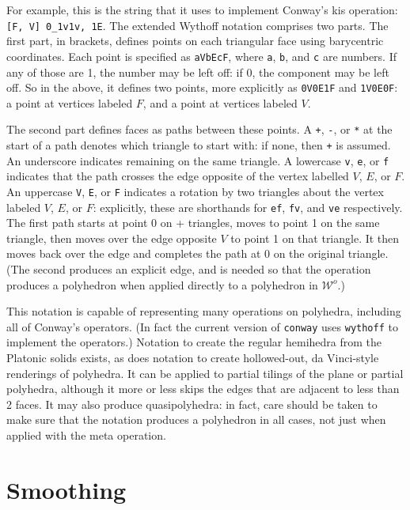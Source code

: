 \documentclass{amsart}[12pt]
\begin{document}
For example, this is the string that it uses to implement Conway's kis
operation: \texttt{[F, V] 0\_1v1v, 1E}. The extended Wythoff notation comprises
two parts. The first part, in brackets, defines points on each triangular face
using barycentric coordinates. Each point is specified as \texttt{aVbEcF}, where
\texttt{a}, \texttt{b}, and \texttt{c} are numbers. If any of those are 1, the
number may be left off: if 0, the component may be left off. So in the above,
it defines two points, more explicitly as \texttt{0V0E1F} and \texttt{1V0E0F}:
a point at vertices labeled $F$, and a point at vertices labeled $V$.

The second part defines faces as paths between these points. A \texttt{+},
\texttt{-}, or \texttt{*} at the start of a path denotes which triangle to
start with: if none, then \texttt{+} is assumed. An underscore indicates
remaining on the same triangle. A lowercase \texttt{v}, \texttt{e}, or
\texttt{f} indicates that the path crosses the edge opposite of the vertex
labelled $V$, $E$, or $F$. An uppercase \texttt{V}, \texttt{E}, or \texttt{F}
indicates a rotation by two triangles about the vertex labeled $V$, $E$, or $F$:
explicitly, these are shorthands for \texttt{ef}, \texttt{fv}, and \texttt{ve}
respectively. The first path starts at point 0 on + triangles, moves to point 1
on the same triangle, then moves over the edge opposite $V$ to point 1 on
that triangle. It then moves back over the edge and completes the path at 0
on the original triangle. (The second produces an explicit edge, and is needed
so that the operation produces a polyhedron when applied directly to a
polyhedron in $\mathcal{W}^o$.)

This notation is capable of representing many operations on polyhedra,
including all of Conway's operators. (In fact the current version of
\texttt{conway} uses \texttt{wythoff} to implement the operators.) Notation to
create the regular hemihedra from the Platonic solids exists, as does notation
to create hollowed-out, da Vinci-style renderings of polyhedra. It can be
applied to partial tilings of the plane or partial polyhedra, although it more
or less skips the edges that are adjacent to less than 2 faces. It may also
produce quasipolyhedra: in fact, care should be taken to make sure that the
notation produces a polyhedron in all cases, not just when applied with the
meta operation.

\section{Smoothing}
\end{document}
